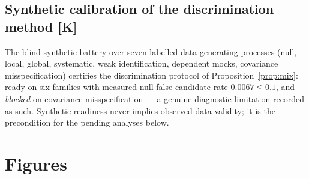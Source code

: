 \documentclass[10pt]{article}
\theoremstyle{definition}
\newcommand{\tier}[1]{\textbf{[#1]}}
\begin{document}
\subsection{Synthetic calibration of the discrimination method
\tier{K}}

The blind synthetic battery over seven labelled data-generating
processes (null, local, global, systematic, weak identification,
dependent mocks, covariance misspecification) certifies the
discrimination protocol of Proposition~\ref{prop:mix}: ready on six
families with measured null false-candidate rate $0.0067 \le 0.1$,
and \emph{blocked} on covariance misspecification --- a genuine
diagnostic limitation recorded as such. Synthetic readiness never
implies observed-data validity; it is the precondition for the
pending analyses below.

\section{Figures}
\label{sec:figures}
\end{document}
